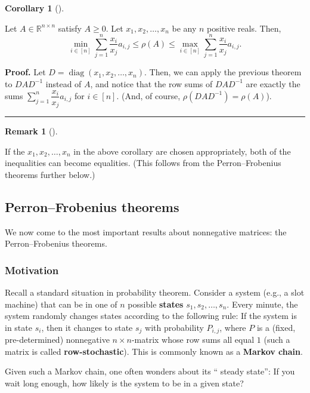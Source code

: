 \documentclass[numbers=enddot,12pt,final,onecolumn,notitlepage]{scrartcl}%
\numberwithin{exer}{subsection}
\theoremstyle{definition}
\newtheorem{remk}[theo]{Remark}
\newenvironment{remark}[1][]
{\begin{remk}[#1]\begin{leftbar}}
{\end{leftbar}\end{remk}}
\newtheorem{coro}[theo]{Corollary}
\newenvironment{corollary}[1][]
{\begin{coro}[#1]\begin{leftbar}}
{\end{leftbar}\end{coro}}
\newenvironment{proof}[1][Proof]{\noindent\textbf{#1.} }{\ \rule{0.5em}{0.5em}}
\let\sumnonlimits\sum
\renewcommand{\sum}{\sumnonlimits\limits}
\begin{document}
\begin{corollary}
Let $A\in\mathbb{R}^{n\times n}$ satisfy $A\geq0$. Let $x_{1},x_{2}%
,\ldots,x_{n}$ be any $n$ positive reals. Then,%
\[
\min\limits_{i\in\left[  n\right]  }\sum_{j=1}^{n}\dfrac{x_{i}}{x_{j}}%
a_{i,j}\leq\rho\left(  A\right)  \leq\max\limits_{i\in\left[  n\right]  }%
\sum_{j=1}^{n}\dfrac{x_{i}}{x_{j}}a_{i,j}.
\]

\end{corollary}

\begin{proof}
Let $D=\operatorname*{diag}\left(  x_{1},x_{2},\ldots,x_{n}\right)  $. Then,
we can apply the previous theorem to $DAD^{-1}$ instead of $A$, and notice
that the row sums of $DAD^{-1}$ are exactly the sums $\sum_{j=1}^{n}%
\dfrac{x_{i}}{x_{j}}a_{i,j}$ for $i\in\left[  n\right]  $. (And, of course,
$\rho\left(  DAD^{-1}\right)  =\rho\left(  A\right)  $).
\end{proof}

\begin{remark}
If the $x_{1},x_{2},\ldots,x_{n}$ in the above corollary are chosen
appropriately, both of the inequalities can become equalities. (This follows
from the Perron--Frobenius theorems further below.)
\end{remark}

\subsection{Perron--Frobenius theorems}

We now come to the most important results about nonnegative matrices: the
Perron--Frobenius theorems.

\subsubsection{Motivation}

Recall a standard situation in probability theorem. Consider a system (e.g., a
slot machine) that can be in one of $n$ possible \textbf{states} $s_{1}%
,s_{2},\ldots,s_{n}$. Every minute, the system randomly changes states
according to the following rule: If the system is in state $s_{i}$, then it
changes to state $s_{j}$ with probability $P_{i,j}$, where $P$ is a (fixed,
pre-determined) nonnegative $n\times n$-matrix whose row sums all equal $1$
(such a matrix is called \textbf{row-stochastic}). This is commonly known as a
\textbf{Markov chain}.

Given such a Markov chain, one often wonders about its \textquotedblleft
steady state\textquotedblright: If you wait long enough, how likely is the
system to be in a given state?
\end{document}
